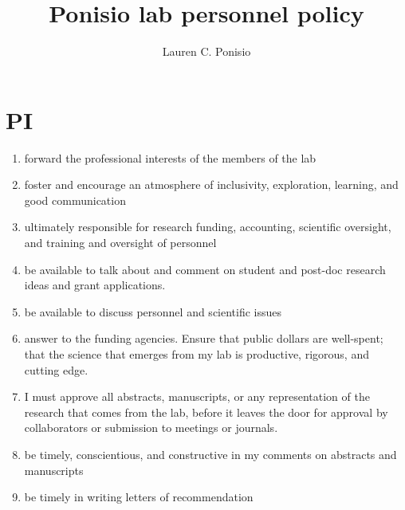 \documentclass[12pt]{article}
\title{Ponisio lab personnel policy}
\author{Lauren C. Ponisio}
\begin{document}
\maketitle

\section{PI}
\begin{enumerate}
\item forward the professional interests of the members of the lab
\item foster and encourage an atmosphere of inclusivity, exploration,
  learning, and good communication
\item ultimately responsible for research funding, accounting,
  scientific oversight, and training and oversight of personnel
\item be available to talk about and comment on student and post-doc
  research ideas and grant applications.
\item be available to discuss personnel and scientific issues
\item answer to the funding agencies. Ensure that public dollars are
  well-spent; that the science that emerges from my lab is productive,
  rigorous, and cutting edge.
\item I must approve all abstracts, manuscripts, or any representation
  of the research that comes from the lab, before it leaves the door
  for approval by collaborators or submission to meetings or journals.
\item be timely, conscientious, and constructive in my comments on
  abstracts and manuscripts
\item be timely in writing letters of recommendation
\end{enumerate}
\end{document}
